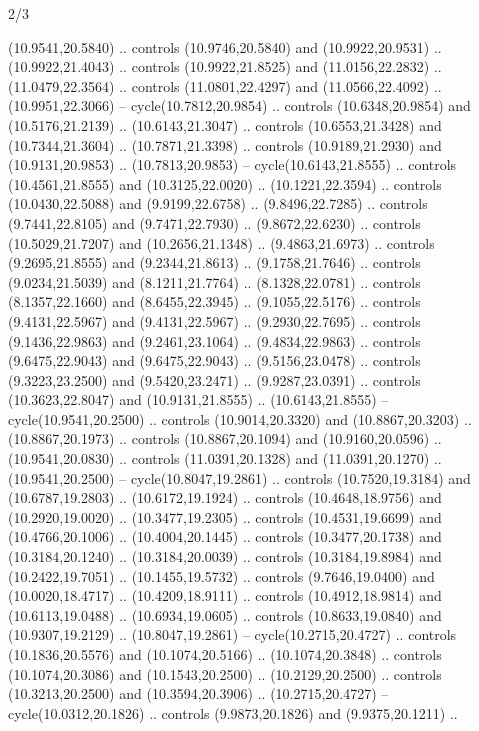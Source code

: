 \begin{flagdescription}{2/3}
\begin{scope}[yshift=\flagwidth,scale=\flagwidth/1241.93737]
\begin{scope}[y=-1mm, x=1mm,draw=gold,fill=blue,line join=miter,miter limit=4,line width=1.8\lw]
{  (10.9541,20.5840) .. controls (10.9746,20.5840) and (10.9922,20.9531) ..
  (10.9922,21.4043) .. controls (10.9922,21.8525) and (11.0156,22.2832) ..
  (11.0479,22.3564) .. controls (11.0801,22.4297) and (11.0566,22.4092) ..
  (10.9951,22.3066) -- cycle(10.7812,20.9854) .. controls (10.6348,20.9854) and
  (10.5176,21.2139) .. (10.6143,21.3047) .. controls (10.6553,21.3428) and
  (10.7344,21.3604) .. (10.7871,21.3398) .. controls (10.9189,21.2930) and
  (10.9131,20.9853) .. (10.7813,20.9853) -- cycle(10.6143,21.8555) .. controls
  (10.4561,21.8555) and (10.3125,22.0020) .. (10.1221,22.3594) .. controls
  (10.0430,22.5088) and (9.9199,22.6758) .. (9.8496,22.7285) .. controls
  (9.7441,22.8105) and (9.7471,22.7930) .. (9.8672,22.6230) .. controls
  (10.5029,21.7207) and (10.2656,21.1348) .. (9.4863,21.6973) .. controls
  (9.2695,21.8555) and (9.2344,21.8613) .. (9.1758,21.7646) .. controls
  (9.0234,21.5039) and (8.1211,21.7764) .. (8.1328,22.0781) .. controls
  (8.1357,22.1660) and (8.6455,22.3945) .. (9.1055,22.5176) .. controls
  (9.4131,22.5967) and (9.4131,22.5967) .. (9.2930,22.7695) .. controls
  (9.1436,22.9863) and (9.2461,23.1064) .. (9.4834,22.9863) .. controls
  (9.6475,22.9043) and (9.6475,22.9043) .. (9.5156,23.0478) .. controls
  (9.3223,23.2500) and (9.5420,23.2471) .. (9.9287,23.0391) .. controls
  (10.3623,22.8047) and (10.9131,21.8555) .. (10.6143,21.8555) --
  cycle(10.9541,20.2500) .. controls (10.9014,20.3320) and (10.8867,20.3203) ..
  (10.8867,20.1973) .. controls (10.8867,20.1094) and (10.9160,20.0596) ..
  (10.9541,20.0830) .. controls (11.0391,20.1328) and (11.0391,20.1270) ..
  (10.9541,20.2500) -- cycle(10.8047,19.2861) .. controls (10.7520,19.3184) and
  (10.6787,19.2803) .. (10.6172,19.1924) .. controls (10.4648,18.9756) and
  (10.2920,19.0020) .. (10.3477,19.2305) .. controls (10.4531,19.6699) and
  (10.4766,20.1006) .. (10.4004,20.1445) .. controls (10.3477,20.1738) and
  (10.3184,20.1240) .. (10.3184,20.0039) .. controls (10.3184,19.8984) and
  (10.2422,19.7051) .. (10.1455,19.5732) .. controls (9.7646,19.0400) and
  (10.0020,18.4717) .. (10.4209,18.9111) .. controls (10.4912,18.9814) and
  (10.6113,19.0488) .. (10.6934,19.0605) .. controls (10.8633,19.0840) and
  (10.9307,19.2129) .. (10.8047,19.2861) -- cycle(10.2715,20.4727) .. controls
  (10.1836,20.5576) and (10.1074,20.5166) .. (10.1074,20.3848) .. controls
  (10.1074,20.3086) and (10.1543,20.2500) .. (10.2129,20.2500) .. controls
  (10.3213,20.2500) and (10.3594,20.3906) .. (10.2715,20.4727) --
  cycle(10.0312,20.1826) .. controls (9.9873,20.1826) and (9.9375,20.1211) ..
}
\end{scope}
\end{scope}
\end{flagdescription}
